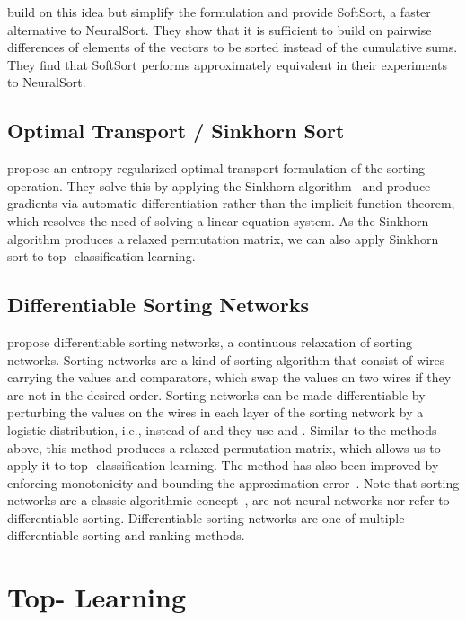 \documentclass{article}
\newcommand{\revA}[1]{{#1}}
\begin{document}
\citet{prillo2020softsort} build on this idea but simplify the formulation and provide SoftSort, a faster alternative to NeuralSort.
They show that it is sufficient to build on pairwise differences of elements of the vectors to be sorted instead of the cumulative sums.
They find that SoftSort performs approximately equivalent in their experiments to NeuralSort.


\subsection{Optimal Transport / Sinkhorn Sort}
\citet{Cuturi2019-SortingOT} propose an entropy regularized optimal transport formulation of the sorting operation.
They solve this by applying the Sinkhorn algorithm~\citep{Cuturi13Sinkhorn} and produce gradients via automatic differentiation rather than the implicit function theorem, which resolves the need of solving a linear equation system.
As the Sinkhorn algorithm produces a relaxed permutation matrix, we can also apply Sinkhorn sort to top- classification learning.

\subsection{Differentiable Sorting Networks}
\citet{Petersen2021-diffsort} propose differentiable sorting networks, a continuous relaxation of sorting networks.
\revA{Sorting networks are a kind of sorting algorithm that consist of wires carrying the values and comparators, which swap the values on two wires if they are not in the desired order. 
Sorting networks can be made differentiable by perturbing the values on the wires in each layer of the sorting network by a logistic distribution, i.e., instead of  and  they use  and .}
Similar to the methods above, this method produces a relaxed permutation matrix, which allows us to apply it to top- classification learning.
The method has also been improved by enforcing monotonicity and bounding the approximation error~\cite{petersen2022monotonic}.
\revA{Note that sorting networks are a classic algorithmic concept~\citep{Knuth1998-3-SortingSearching}, are not neural networks nor refer to differentiable sorting.
Differentiable sorting networks are one of multiple differentiable sorting and ranking methods.
}







\section{Top- Learning}
\end{document}

